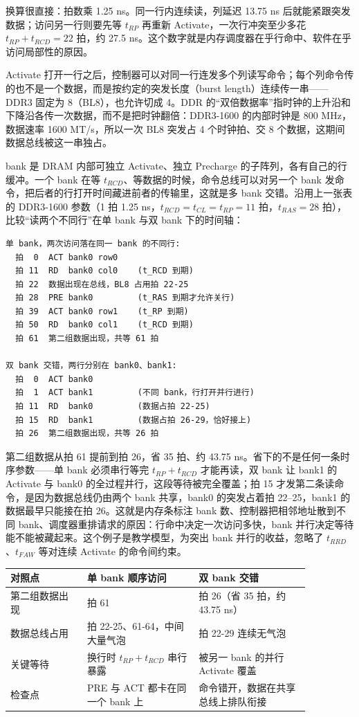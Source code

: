换算很直接：拍数乘 1.25 ns。同一行内连续读，列延迟 13.75 ns 后就能紧跟突发数据；访问另一行则要先等 $t_{RP}$ 再重新 Activate，一次行冲突至少多花 $t_{RP}+t_{RCD}=22$ 拍，约 27.5 ns。这个数字就是内存调度器在乎行命中、软件在乎访问局部性的原因。

Activate 打开一行之后，控制器可以对同一行连发多个列读写命令；每个列命令传的也不是一个数据，而是按约定的突发长度（burst length）连续传一串——DDR3 固定为 8（BL8），也允许切成 4。DDR 的“双倍数据率”指时钟的上升沿和下降沿各传一次数据，而不是把时钟翻倍：DDR3-1600 的内部时钟是 800 MHz，数据速率 1600 MT/s，所以一次 BL8 突发占 4 个时钟拍、交 8 个数据，这期间数据总线被这一串独占。

bank 是 DRAM 内部可独立 Activate、独立 Precharge 的子阵列，各有自己的行缓冲。一个 bank 在等 $t_{RCD}$、等数据的时候，命令总线可以对另一个 bank 发命令，把后者的行打开时间藏进前者的传输里，这就是多 bank 交错。沿用上一张表的 DDR3-1600 参数（1 拍 1.25 ns，$t_{RCD}=t_{CL}=t_{RP}=11$ 拍，$t_{RAS}=28$ 拍），比较“读两个不同行”在单 bank 与双 bank 下的时间轴：

\begin{lstlisting}
单 bank，两次访问落在同一 bank 的不同行:
  拍  0  ACT bank0 row0
  拍 11  RD  bank0 col0    (t_RCD 到期)
  拍 22  数据出现在总线，BL8 占用拍 22-25
  拍 28  PRE bank0         (t_RAS 到期才允许关行)
  拍 39  ACT bank0 row1    (t_RP 到期)
  拍 50  RD  bank0 col1    (t_RCD 到期)
  拍 61  第二组数据出现，共等 61 拍

双 bank 交错，两行分别在 bank0、bank1:
  拍  0  ACT bank0
  拍  1  ACT bank1         (不同 bank，行打开并行进行)
  拍 11  RD  bank0         (数据占拍 22-25)
  拍 15  RD  bank1         (数据占拍 26-29，恰好接上)
  拍 26  第二组数据出现，共等 26 拍
\end{lstlisting}

第二组数据从拍 61 提前到拍 26，省 35 拍、约 43.75 ns。省下的不是任何一条时序参数——单 bank 必须串行等完 $t_{RP}+t_{RCD}$ 才能再读，双 bank 让 bank1 的 Activate 与 bank0 的全过程并行，这段等待被完全覆盖；拍 15 才发第二条读命令，是因为数据总线仍由两个 bank 共享，bank0 的突发占着拍 22--25，bank1 的数据最早只能接在拍 26。这就是内存条标注 bank 数、控制器把相邻地址散到不同 bank、调度器重排请求的原因：行命中决定一次访问多快，bank 并行决定等待能不能被藏起来。这个例子是教学模型，为突出 bank 并行的收益，忽略了 $t_{RRD}$、$t_{FAW}$ 等对连续 Activate 的命令间约束。

\begin{longtable}{L{0.22\linewidth}L{0.32\linewidth}L{0.32\linewidth}}
\toprule
对照点 & 单 bank 顺序访问 & 双 bank 交错 \\
\midrule
第二组数据出现 & 拍 61 & 拍 26（省 35 拍，约 43.75 ns） \\
数据总线占用 & 拍 22-25、61-64，中间大量气泡 & 拍 22-29 连续无气泡 \\
关键等待 & 换行时 $t_{RP}+t_{RCD}$ 串行暴露 & 被另一 bank 的并行 Activate 覆盖 \\
检查点 & PRE 与 ACT 都卡在同一个 bank 上 & 命令错开，数据在共享总线上排队衔接 \\
\bottomrule
\end{longtable}

